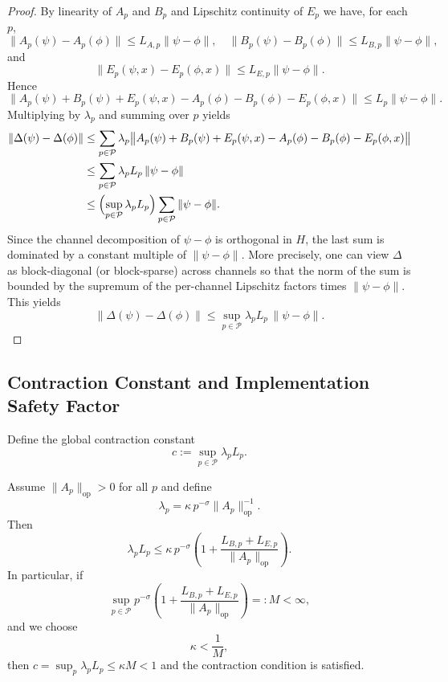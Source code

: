 \documentclass[11pt]{article}
\begin{document}
\begin{proof}
By linearity of $A_p$ and $B_p$ and Lipschitz continuity of $E_p$ we have, for each $p$,
\[
  \| A_p(\psi) - A_p(\phi) \| \le L_{A,p}\|\psi - \phi\|,
  \quad
  \| B_p(\psi) - B_p(\phi) \| \le L_{B,p}\|\psi - \phi\|,
\]
and
\[
  \| E_p(\psi,x) - E_p(\phi,x) \| \le L_{E,p}\|\psi - \phi\|.
\]
Hence
\[
  \bigl\|A_p(\psi) + B_p(\psi) + E_p(\psi,x)
            - A_p(\phi) - B_p(\phi) - E_p(\phi,x) \bigr\|
  \le L_p \|\psi - \phi\|.
\]
Multiplying by $\lambda_p$ and summing over $p$ yields
\begin{align*}
  \|\Delta(\psi) - \Delta(\phi)\|
  &\le \sum_{p \in \mathcal{P}} \lambda_p
       \bigl\| A_p(\psi) + B_p(\psi) + E_p(\psi,x)
          - A_p(\phi) - B_p(\phi) - E_p(\phi,x)\bigr\| \\
  &\le \sum_{p \in \mathcal{P}} \lambda_p L_p \, \|\psi - \phi\| \\
  &\le \Bigl( \sup_{p \in \mathcal{P}} \lambda_p L_p \Bigr) \sum_{p \in \mathcal{P}} \|\psi - \phi\|.
\end{align*}
Since the channel decomposition of $\psi - \phi$ is orthogonal in $H$, the last sum is dominated by a constant multiple of $\|\psi - \phi\|$.
More precisely, one can view $\Delta$ as block-diagonal (or block-sparse) across channels so that the norm of the sum is bounded by the supremum of the per-channel Lipschitz factors times $\|\psi - \phi\|$.
This yields
\[
  \|\Delta(\psi) - \Delta(\phi)\|
  \le \sup_{p \in \mathcal{P}} \lambda_p L_p \, \|\psi - \phi\|.
\]
\end{proof}

\subsection{Contraction Constant and Implementation Safety Factor}

Define the global contraction constant
\begin{equation}
  c := \sup_{p \in \mathcal{P}} \lambda_p L_p.
\end{equation}

\begin{lemma}
\label{lem:contraction-safety}
Assume $\|A_p\|_{\mathrm{op}} > 0$ for all $p$ and define
\begin{equation}
  \lambda_p = \kappa\, p^{-\sigma} \|A_p\|_{\mathrm{op}}^{-1}.
\end{equation}
Then
\begin{equation}
  \lambda_p L_p
  \le \kappa\, p^{-\sigma} \left( 1 + \frac{L_{B,p} + L_{E,p}}{\|A_p\|_{\mathrm{op}}} \right).
\end{equation}
In particular, if
\begin{equation}
  \sup_{p \in \mathcal{P}}
  p^{-\sigma} \left( 1 + \frac{L_{B,p} + L_{E,p}}{\|A_p\|_{\mathrm{op}}} \right)
  =: M < \infty,
\end{equation}
and we choose
\begin{equation}
  \kappa < \frac{1}{M},
\end{equation}
then $c = \sup_p \lambda_p L_p \le \kappa M < 1$ and the contraction condition is satisfied.
\end{lemma}
\end{document}
